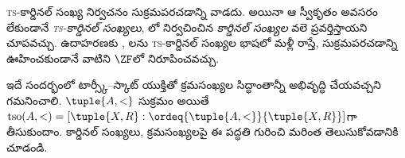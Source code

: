 \documentclass[../../../include/open-logic-section]{subfiles}
\begin{document}
\textsc{ts}-కార్డినల్ సంఖ్య నిర్వచనం సుక్రమపరచడాన్ని వాడదు. అయినా ఆ స్వీకృతం అవసరం లేకుండానే \emph{\textsc{ts}-కార్డినల్ సంఖ్యలు}, లో నిర్వచించిన \emph{కార్డినల్ సంఖ్యల} వలె ప్రవర్తిస్తాయని చూపవచ్చు. ఉదాహరణకు , లను \textsc{ts}-కార్డినల్ సంఖ్యల భాషలో మళ్లీ రాస్తే, సుక్రమపరచడాన్ని ఊహించకుండానే వాటిని $\ZF$లో నిరూపించవచ్చు.

ఇదే సందర్భంలో టార్స్కీ--స్కాట్ యుక్తితో క్రమసంఖ్యల సిద్ధాంతాన్నీ అభివృద్ధి చేయవచ్చని గమనించాలి. $\tuple{A, <}$ సుక్రమం అయితే $\text{tso}(A, <) = [\tuple{X,
R} : \ordeq{\tuple{A, <}}{\tuple{X, R}}]$గా తీసుకుందాం. కార్డినల్ సంఖ్యలు, క్రమసంఖ్యలపై ఈ పద్ధతి గురించి మరింత తెలుసుకోవడానికి \citet[chs.~9--12]{Potter2004} చూడండి.
\end{document}
